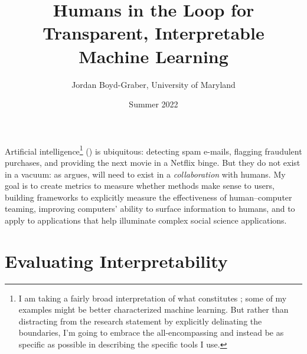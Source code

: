 \usepackage{graphicx}
\usepackage{amssymb}
\usepackage{colortbl}
\usepackage{epstopdf}
\usepackage{url}


\usepackage[top=1in, bottom=1in, left=1in, right=1in]{geometry}

\newcommand{\student}[1]{\vspace{.5cm}\fbox{\parbox{0.95\linewidth}{{\small
        #1}}}\vspace{.5cm}}
\providecommand{\blue}[1]{{\color{blue}{#1}}}
\providecommand{\red}[1]{{\color{red}{#1}}}
\providecommand{\green}[1]{{\color{green}{#1}}}



 \title{Humans in the Loop for Transparent, Interpretable Machine Learning}

 \author{Jordan Boyd-Graber, University of Maryland}


\date{Summer 2022}

\maketitle

Artificial intelligence\footnote{I am taking a fairly broad
  interpretation of what constitutes ; some of my examples
  might be better characterized machine learning.  But rather than
  distracting from the research statement by explicitly delinating the
  boundaries, I'm going to embrace the all-encompassing  and
  instead be as specific as possible in describing the specific tools
  I use.} () is ubiquitous: detecting spam e-mails, flagging
  fraudulent purchases, and providing the next movie in a Netflix
  binge.
%
But they do not exist in a vacuum: as 
argues,  will need to exist in a \emph{collaboration} with
humans.
%
My goal is to create metrics to measure whether  methods make
sense to users, building frameworks to explicitly measure the
effectiveness of human--computer teaming, improving computers' ability
to surface information to humans, and to apply 
to applications that help illuminate complex social science
applications.

\section{Evaluating Interpretability}

